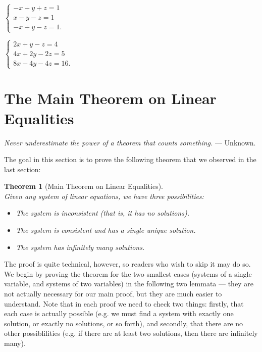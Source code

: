 \documentclass[a4paper,leqno]{article}
\numberwithin{equation}{section}
\newtheorem{thm}[equation]{Theorem}
\theoremstyle{definition}
\theoremstyle{remark}
\begin{document}
\begin{enumerate}
\begin{center}
\begin{enumerate*}
        \item
          $ \displaystyle
            \begin{cases}
              - x + y + z = 1\\
              x - y - z = 1\\
              -x + y - z = 1.
            \end{cases}
          $\hspace*{\fill}
        \item
          $ \displaystyle
            \begin{cases}
              2x + y - z = 4\\
              4x + 2y - 2z = 5\\
              8x - 4y - 4z = 16.
            \end{cases}
          $\hspace*{\fill}
      \end{enumerate*}
    \end{center}
\end{enumerate}

\section{The Main Theorem on Linear Equalities}
\begin{center}
  \emph{Never underestimate the power of a theorem that counts something.}  --- Unknown.
\end{center}
The goal in this section is to prove the following theorem that we observed in the last section:
\begin{thm}[Main Theorem on Linear Equalities]\ \\
  Given any system of linear equations, we have three possibilities:
  \begin{itemize}
    \item The system is inconsistent (that is, it has no solutions).
    \item The system is consistent and has a single unique solution.
    \item The system has infinitely many solutions.
  \end{itemize}
\end{thm}

The proof is quite technical, however, so readers who wish to skip it may do so. We begin by proving the theorem for the two smallest cases (systems
of a single variable, and systems of two variables) in the following two lemmata --- they are not actually necessary for our main proof, but they are
much easier to understand. Note that in each proof we need to check two things: firstly, that each case is actually possible (e.g. we must find a
system with exactly one solution, or exactly no solutions, or so forth), and secondly, that there are no other possiblilities (e.g. if there are at least
two solutions, then there are infinitely many).
\end{document}
